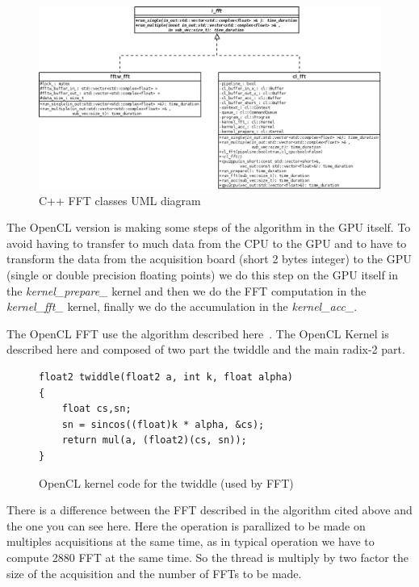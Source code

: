 \begin{figure}[H]
\centering
\caption{C++ FFT classes UML diagram}
\includegraphics[scale=0.3]{fft_uml.png}
\end{figure}

The \gls{OpenCL} version is making some steps of the algorithm in the \gls{GPU} itself. To avoid having to transfer to much data from the CPU to the GPU and to have to transform the data from the acquisition board (short 2 bytes integer) to the \gls{GPU} (single or double precision floating points) we do this step on the \gls{GPU} itself in the \emph{kernel\_prepare\_} kernel and then we do the \gls{FFT} computation in the \emph{kernel\_fft\_} kernel, finally we do the accumulation in the \emph{kernel\_acc\_}.

The \gls{OpenCL} \gls{FFT} use the algorithm described here~\cite{Govindaraju07}. The OpenCL Kernel is described here and composed of two part the twiddle and the main radix-2 part.

\begin{figure}[H]
\centering
\caption{OpenCL kernel code for the twiddle (used by FFT)}
\label{fig:twidle_cl}
\begin{lstlisting}
float2 twiddle(float2 a, int k, float alpha)
{
	float cs,sn;
	sn = sincos((float)k * alpha, &cs);
	return mul(a, (float2)(cs, sn));
}
\end{lstlisting}
\end{figure}

There is a difference between the \gls{FFT} described in the algorithm cited above and the one you can see here. Here the operation is parallized to be made on multiples acquisitions at the same time, as in typical operation we have to compute 2880 FFT at the same time. So the thread is multiply by two factor the size of the acquisition and the number of \glspl{FFT} to be made.

